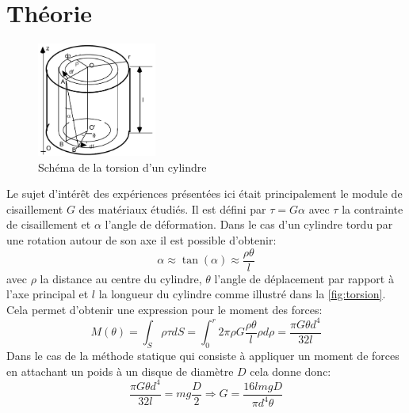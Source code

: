 \section{Théorie}

\begin{minipage}{\linewidth}
    \begin{figure}
        \includegraphics[width=0.35\textwidth]{figures/torsion.png}
        \caption{Schéma de la torsion d'un cylindre \cite{notice}}
        \label{fig:torsion}
    \end{figure}
    
    Le sujet d'intérêt des expériences présentées ici était principalement le module de cisaillement $G$ des matériaux étudiés. Il est défini par $\tau = G\alpha$ avec $\tau$ la contrainte de cisaillement et $\alpha$ l'angle de déformation. Dans le cas d'un cylindre tordu par une rotation autour de son axe il est possible d'obtenir:
    \begin{equation}
        \alpha \approx \tan(\alpha) \approx \frac{\rho \theta}{l}
    \end{equation}
    avec $\rho$ la distance au centre du cylindre, $\theta$ l'angle de déplacement par rapport à l'axe principal et $l$ la longueur du cylindre comme illustré dans la \autoref{fig:torsion}. Cela permet d'obtenir une expression pour le moment des forces:
    \begin{equation}
        M(\theta) = \int_{S}\rho\tau dS = \int_{0}^{r}2\pi\rho G \frac{\rho \theta}{l} \rho d\rho = \frac{\pi G\theta d^4}{32l}
    \end{equation}
    Dans le cas de la méthode statique qui consiste à appliquer un moment de forces en attachant un poids à un disque de diamètre $D$ cela donne donc:
    \begin{equation}
        \frac{\pi G\theta d^4}{32l} = mg\frac{D}{2} \Rightarrow G = \frac{16 l m g D}{\pi d^4 \theta}
        \label{eq:module_cisaillement_statique}
    \end{equation}
\end{minipage}

